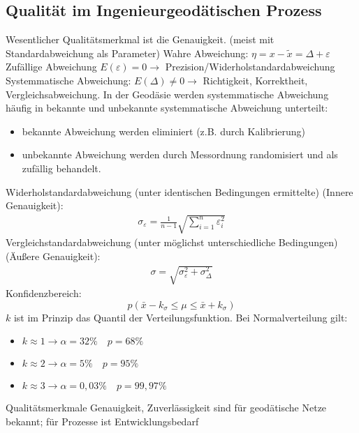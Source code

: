 \documentclass[12pt]{article}
\begin{document}
\subsection{Qualität im Ingenieurgeodätischen Prozess}
Wesentlicher Qualitätsmerkmal ist die Genauigkeit. (meist mit Standardabweichung als Parameter) \newline
\newline
Wahre Abweichung: $\eta = x-\tilde{x} = \Delta + \varepsilon$ \newline
Zufällige Abweichung $E(\varepsilon) = 0 \longrightarrow$  Prezision/Widerholstandardabweichung \newline
Systemmatische Abweichung: $E(\Delta) \neq 0 \longrightarrow$ Richtigkeit, Korrektheit, Vergleichsabweichung. \newline
\newline
In der Geodäsie werden systemmatische Abweichung häufig in bekannte und unbekannte systemmatische Abweichung unterteilt: 
\begin{itemize}
\item bekannte Abweichung werden eliminiert (z.B. durch Kalibrierung)
\item unbekannte Abweichung werden durch Messordnung randomisiert und als zufällig behandelt.
\end{itemize}
Widerholstandardabweichung (unter identischen Bedingungen ermittelte) (Innere Genauigkeit):
\begin{gather*}
\sigma_{\varepsilon} = \frac{1}{n-1} \sqrt{\sum_{i=1}^{n} \varepsilon^2_i}
\end{gather*}
Vergleichstandardabweichung (unter möglichst unterschiedliche Bedingungen) (Äußere Genauigkeit):
\begin{gather*}
\sigma = \sqrt{\sigma_{\varepsilon}^2 + \sigma_{\Delta}^2}
\end{gather*}
Konfidenzbereich:
\begin{equation*}
p(\bar{x} - k_{\sigma} \leq \mu \leq \bar{x} + k_{\sigma})
\end{equation*}
$k$ ist im Prinzip das Quantil der Verteilungsfunktion. Bei Normalverteilung gilt:
\begin{itemize}
\item $k \approx 1 \longrightarrow \alpha = 32\% \quad p=68\%$
\item $k \approx 2 \longrightarrow \alpha = 5\% \quad p=95\%$
\item $k \approx 3 \longrightarrow \alpha = 0,03\% \quad p=99,97\%$
\end{itemize}
Qualitätsmerkmale Genauigkeit, Zuverlässigkeit sind für geodätische Netze bekannt; für Prozesse ist Entwicklungsbedarf
\end{document}
